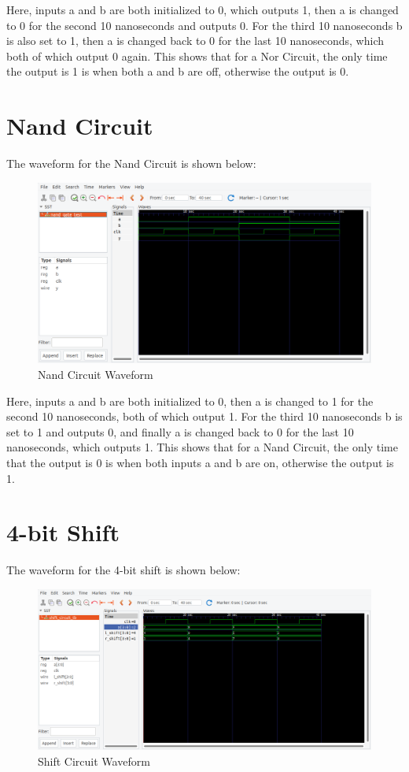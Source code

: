 \documentclass[runningheads, 12pt]{report}
\begin{document}
Here, inputs a and b are both initialized to 0, which outputs 1, then a is changed to 0 for the second 10 nanoseconds and outputs 0. For the third 10 nanoseconds b is also set to 1, then a is changed back to 0 for the last 10 nanoseconds, which both of which output 0 again. This shows that for a Nor Circuit, the only time the output is 1 is when both a and b are off, otherwise the output is 0. \pagebreak
	\section{Nand Circuit}

The waveform for the Nand Circuit is shown below:

\begin{figure}[h]
	\centering
	\includegraphics[width=1.0\textwidth]{nand_gate_wf}
	\caption{Nand Circuit Waveform}
	\label{fig: nand_gate_wf}
\end{figure}

Here, inputs a and b are both initialized to 0, then a is changed to 1 for the second 10 nanoseconds, both of which output 1. For the third 10 nanoseconds b is set to 1 and outputs 0, and finally a is changed back to 0 for the last 10 nanoseconds, which outputs 1. This shows that for a Nand Circuit, the only time that the output is 0 is when both inputs a and b are on, otherwise the output is 1.\pagebreak

\section{4-bit Shift}
The waveform for the 4-bit shift is shown below:

\begin{figure}[h]
	\centering
	\includegraphics[width=1.10\textwidth]{shift_circuit_wf}
	\caption{Shift Circuit Waveform}
	\label{fig: shift_circuit_wf}
\end{figure}
\end{document}
